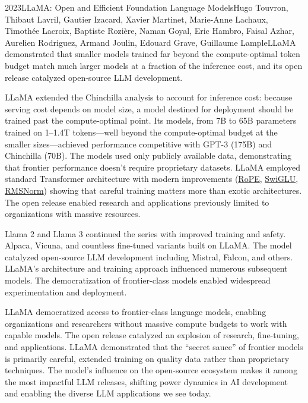 
\begin{papersummary}{2023}{LLaMA: Open and Efficient Foundation Language Models}{Hugo Touvron, Thibaut Lavril, Gautier Izacard, Xavier Martinet, Marie-Anne Lachaux, Timothée Lacroix, Baptiste Rozière, Naman Goyal, Eric Hambro, Faisal Azhar, Aurelien Rodriguez, Armand Joulin, Edouard Grave, Guillaume Lample}{LLaMA demonstrated that smaller models trained far beyond the compute-optimal token budget match much larger models at a fraction of the inference cost, and its open release catalyzed open-source LLM development.}

LLaMA extended the Chinchilla analysis to account for inference cost: because serving cost depends on model size, a model destined for deployment should be trained past the compute-optimal point. Its models, from 7B to 65B parameters trained on 1--1.4T tokens---well beyond the compute-optimal budget at the smaller sizes---achieved performance competitive with GPT-3 (175B) and Chinchilla (70B). The models used only publicly available data, demonstrating that frontier performance doesn't require proprietary datasets. LLaMA employed standard Transformer architecture with modern improvements (\hyperref[paper:su-2021]{RoPE}, \hyperref[paper:shazeer-2020]{SwiGLU}, \hyperref[paper:zhang-2019-rmsnorm]{RMSNorm}) showing that careful training matters more than exotic architectures. The open release enabled research and applications previously limited to organizations with massive resources.

Llama 2 and Llama 3 continued the series with improved training and safety. Alpaca, Vicuna, and countless fine-tuned variants built on LLaMA. The model catalyzed open-source LLM development including Mistral, Falcon, and others. LLaMA's architecture and training approach influenced numerous subsequent models. The democratization of frontier-class models enabled widespread experimentation and deployment.

LLaMA democratized access to frontier-class language models, enabling organizations and researchers without massive compute budgets to work with capable models. The open release catalyzed an explosion of research, fine-tuning, and applications. LLaMA demonstrated that the ``secret sauce'' of frontier models is primarily careful, extended training on quality data rather than proprietary techniques. The model's influence on the open-source ecosystem makes it among the most impactful LLM releases, shifting power dynamics in AI development and enabling the diverse LLM applications we see today.

\end{papersummary}
